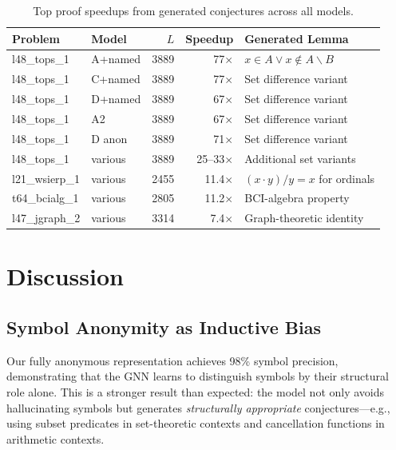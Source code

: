 \documentclass{article}
\begin{document}
\begin{table}[t]
\centering
\caption{Top proof speedups from generated conjectures across all models.}
\label{tab:best_speedups}
\small
\begin{tabular}{llrrl}
\toprule
\textbf{Problem} & \textbf{Model} & \textbf{$L$} & \textbf{Speedup} & \textbf{Generated Lemma} \\
\midrule
l48\_tops\_1 & A+named & 3889 & 77$\times$ & $x{\in}A \lor x{\notin}A\backslash B$ \\
l48\_tops\_1 & C+named & 3889 & 77$\times$ & Set difference variant \\
l48\_tops\_1 & D+named & 3889 & 67$\times$ & Set difference variant \\
l48\_tops\_1 & A2 & 3889 & 67$\times$ & Set difference variant \\
l48\_tops\_1 & D anon & 3889 & 71$\times$ & Set difference variant \\
l48\_tops\_1 & various & 3889 & 25--33$\times$ & Additional set variants \\
l21\_wsierp\_1 & various & 2455 & 11.4$\times$ & $(x{\cdot}y)/y = x$ for ordinals \\
t64\_bcialg\_1 & various & 2805 & 11.2$\times$ & BCI-algebra property \\
l47\_jgraph\_2 & various & 3314 & 7.4$\times$ & Graph-theoretic identity \\
\bottomrule
\end{tabular}
\end{table}

\section{Discussion}
\label{sec:discussion}

\subsection{Symbol Anonymity as Inductive Bias}

Our fully anonymous representation achieves 98\% symbol precision, demonstrating
that the GNN learns to distinguish symbols by their structural role alone. This
is a stronger result than expected: the model not only avoids hallucinating
symbols but generates \emph{structurally appropriate} conjectures---e.g., using
subset predicates in set-theoretic contexts and cancellation functions in
arithmetic contexts.
\end{document}
